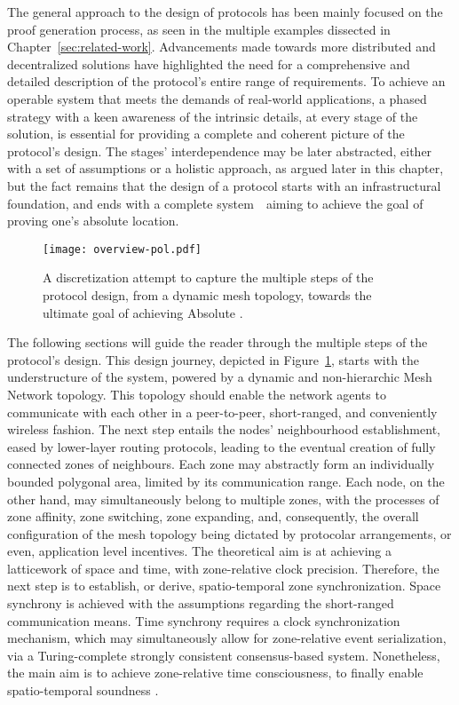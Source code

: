 The general approach to the design of \pol{} protocols has been mainly focused on the proof generation process, as seen in the multiple examples dissected in Chapter~\ref{sec:related-work}. Advancements made towards more distributed and decentralized solutions have highlighted the need for a comprehensive and detailed description of the protocol's entire range of requirements. To achieve an operable system that meets the demands of real-world applications, a phased strategy with a keen awareness of the intrinsic details, at every stage of the solution, is essential for providing a complete and coherent picture of the protocol's design. The stages' interdependence may be later abstracted, either with a set of assumptions or a holistic approach, as argued later in this chapter, but the fact remains that the design of a \pol{} protocol starts with an infrastructural foundation, and ends with a complete system~\textemdash~aiming to achieve the goal of proving one's absolute location.

\begin{figure}[ht]
    \begin{center}
    \texttt{[image: overview-pol.pdf]}
    \caption{A discretization attempt to capture the multiple steps of the protocol design, from a dynamic mesh topology, towards the ultimate goal of achieving Absolute \pol.}
    \label{fig:proof-of-location-overview}
    \end{center}
\end{figure}

The following sections will guide the reader through the multiple steps of the protocol's design. This design journey, depicted in Figure~\ref{fig:proof-of-location-overview}, starts with the understructure of the system, powered by a dynamic and non-hierarchic Mesh Network topology. This topology should enable the network agents to communicate with each other in a peer-to-peer, short-ranged, and conveniently wireless fashion. The next step entails the nodes' neighbourhood establishment, eased by lower-layer routing protocols, leading to the eventual creation of fully connected zones of neighbours. Each zone may abstractly form an individually bounded polygonal area, limited by its communication range. Each node, on the other hand, may simultaneously belong to multiple zones, with the processes of zone affinity, zone switching, zone expanding, and, consequently, the overall configuration of the mesh topology being dictated by protocolar arrangements, or even, application level incentives. The theoretical aim is at achieving a latticework of space and time, with zone-relative clock precision. Therefore, the next step is to establish, or derive, spatio-temporal zone synchronization. Space synchrony is achieved with the assumptions regarding the short-ranged communication means. Time synchrony requires a clock synchronization mechanism, which may simultaneously allow for zone-relative event serialization, via a Turing-complete strongly consistent consensus-based system. Nonetheless, the main aim is to achieve zone-relative time consciousness, to finally enable spatio-temporal soundness \cite{nasrulin2018robust}.

